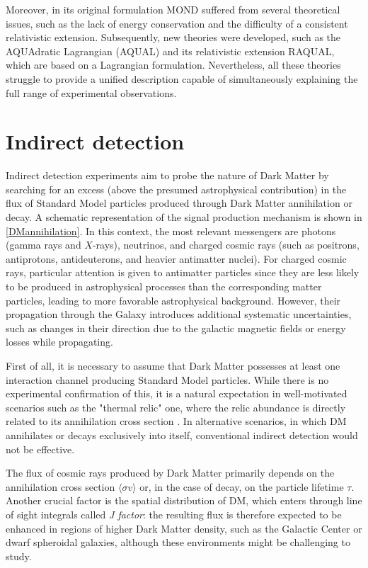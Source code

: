 Moreover, in its original formulation MOND suffered from several theoretical issues, such as the lack of energy conservation and the difficulty of a consistent relativistic extension.
Subsequently, new theories were developed, such as the AQUAdratic Lagrangian (AQUAL) \cite{AQUAL} and its relativistic extension RAQUAL, which are based on a Lagrangian formulation. Nevertheless, all these theories struggle to provide a unified description capable of simultaneously explaining the full range of experimental observations.



\section{Indirect detection}


Indirect detection experiments aim to probe the nature of Dark Matter by searching for an excess (above the presumed astrophysical contribution) in the flux of Standard Model particles produced through Dark Matter annihilation or decay. A schematic representation of the signal production mechanism is shown in \cref{DMannihilation}.
In this context, the most relevant messengers are photons (gamma rays and $X$-rays), neutrinos, and charged cosmic rays (such as positrons, antiprotons, antideuterons, and heavier antimatter nuclei).
For charged cosmic rays, particular attention is given to antimatter particles since they are less likely to be produced in astrophysical processes than the corresponding matter particles, leading to more favorable astrophysical background. However, their propagation through the Galaxy introduces additional systematic uncertainties, such as changes in their direction due to the galactic magnetic fields or energy losses while propagating.

First of all, it is necessary to assume that Dark Matter possesses at least one interaction channel producing Standard Model particles. While there is no experimental confirmation of this, it is a natural expectation in well-motivated scenarios such as the "thermal relic" one, where the relic abundance is directly related to its annihilation cross section \cite{Slatyer}.
In alternative scenarios, in which DM annihilates or decays exclusively into itself, conventional indirect detection would not be effective.

The flux of cosmic rays produced by Dark Matter primarily depends on the annihilation cross section $\langle\sigma v\rangle$ or, in the case of decay, on the particle lifetime $\tau$.
Another crucial factor is the spatial distribution of DM, which enters through line of sight integrals called \emph{J factor}: the resulting flux is therefore expected to be enhanced in regions of higher Dark Matter density, such as the Galactic Center or dwarf spheroidal galaxies, although these environments might be challenging to study. 



